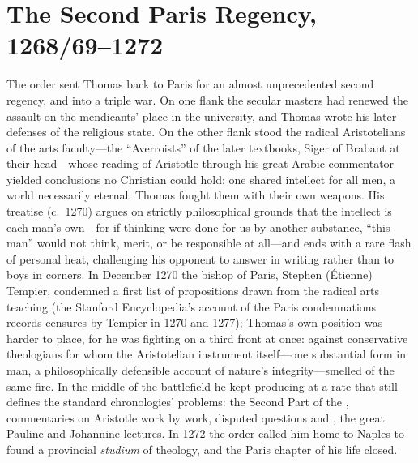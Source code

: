 \section{The Second Paris Regency, 1268/69--1272}

The order sent Thomas back to Paris for an almost unprecedented second
regency, and into a triple war. On one flank the secular masters had
renewed the assault on the mendicants' place in the university, and
Thomas wrote his later defenses of the religious state. On the other
flank stood the radical Aristotelians of the arts faculty---the
``Averroists'' of the later textbooks, Siger of Brabant at their
head---whose reading of Aristotle through his great Arabic commentator
yielded conclusions no Christian could hold: one shared intellect for all
men, a world necessarily eternal. Thomas fought them with their own
weapons. His treatise 
(c.~1270) argues on strictly philosophical grounds that the intellect is
each man's own---for if thinking were done for us by another substance,
``this man'' would not think, merit, or be responsible at all---and ends
with a rare flash of personal heat, challenging his opponent to answer
in writing rather than to boys in corners. In December 1270 the bishop
of Paris, Stephen (\'Etienne) Tempier, condemned a first list of
propositions drawn from the radical arts teaching (the Stanford
Encyclopedia's account of the Paris condemnations records censures by
Tempier in 1270 and 1277); Thomas's own position was harder to place,
for he was fighting on a third front at once: against conservative
theologians for whom the Aristotelian instrument itself---one substantial
form in man, a philosophically defensible account of nature's
integrity---smelled of the same fire. In the middle of the battlefield
he kept producing at a rate that still defines the standard chronologies'
problems: the Second Part of the , commentaries on Aristotle
work by work, disputed questions  and ,
the great Pauline and Johannine lectures. In 1272 the order called him
home to Naples to found a provincial \textit{studium} of theology, and
the Paris chapter of his life closed.
